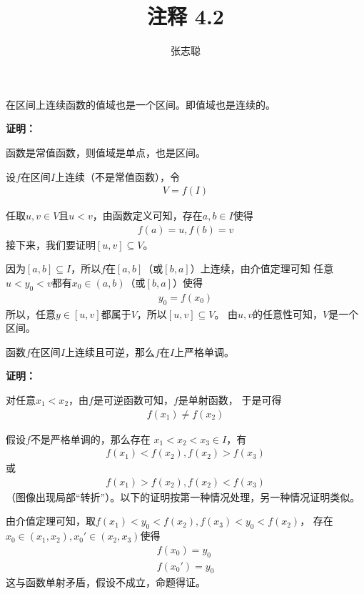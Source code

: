 \documentclass{article}
\begin{document}
\title{注释 4.2}
\author{张志聪}
\maketitle
\begin{zremark}
  在区间上连续函数的值域也是一个区间。即值域也是连续的。
\end{zremark}

\textbf{证明：}

函数是常值函数，则值域是单点，也是区间。

设$f$在区间$I$上连续（不是常值函数），令
\begin{align*}
  V = f(I)
\end{align*}

任取$u, v \in V$且$u < v$，由函数定义可知，存在$a, b \in I$使得
\begin{align*}
  f(a) = u, f(b) = v
\end{align*}
接下来，我们要证明$[u, v] \subseteq V$。

因为$[a, b] \subseteq I$，所以$f$在$[a, b]$（或$[b, a]$）上连续，由介值定理可知
任意$u < y_0 < v$都有$x_0 \in (a, b)$（或$[b, a]$）使得
\begin{align*}
  y_0 = f(x_0)
\end{align*}
所以，任意$y \in [u, v]$都属于$V$，所以$[u, v] \subseteq V$。
由$u, v$的任意性可知，$V$是一个区间。

\begin{zremark}
  函数$f$在区间$I$上连续且可逆，那么$f$在$I$上严格单调。
\end{zremark}

\textbf{证明：}

对任意$x_1 < x_2$，由$f$是可逆函数可知，$f$是单射函数，
于是可得
\begin{align*}
  f(x_1) \neq f(x_2)
\end{align*}

假设$f$不是严格单调的，那么存在
$x_1 < x_2 < x_3 \in I$，有
\begin{align*}
  f(x_1) < f(x_2), f(x_2) > f(x_3)
\end{align*}
或
\begin{align*}
  f(x_1) > f(x_2), f(x_2) < f(x_3)
\end{align*}
（图像出现局部“转折”）。以下的证明按第一种情况处理，另一种情况证明类似。

由介值定理可知，取$f(x_1) < y_0 < f(x_2), f(x_3) < y_0 < f(x_2)$，
存在$x_0 \in (x_1, x_2), x_0' \in (x_2, x_3)$使得
\begin{align*}
  f(x_0) = y_0 \\
  f(x_0') = y_0
\end{align*}
这与函数单射矛盾，假设不成立，命题得证。
\end{document}
